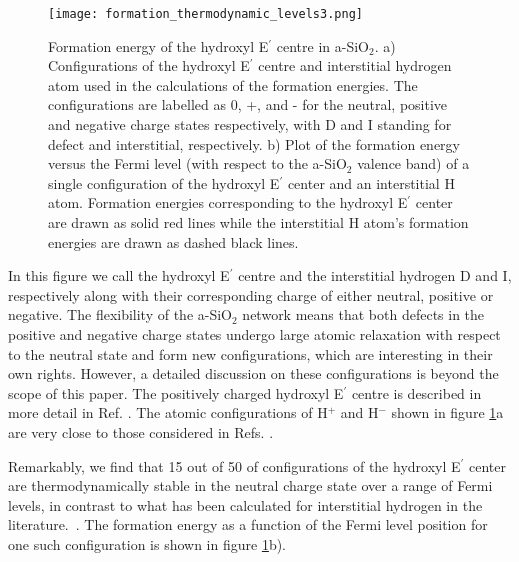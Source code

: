 \documentclass[aps,prb,reprint,superscriptaddress,showpacs]{revtex4-1}
\begin{document}
\begin{figure}[h!]
\texttt{[image: formation\_thermodynamic\_levels3.png]}
\caption{Formation energy of the hydroxyl E$^\prime$ centre in a-SiO$_2$. a) Configurations of the hydroxyl E$^\prime$ centre and interstitial hydrogen atom used in the calculations of the formation energies.  The configurations are labelled as 0, +, and - for the neutral, positive and negative charge states respectively, with D and I standing for defect and interstitial, respectively. b) Plot of the formation energy versus the Fermi level (with respect to the a-SiO$_2$ valence band) of a single configuration of the hydroxyl E$^\prime$ center and an interstitial H atom. Formation energies corresponding to the hydroxyl E$^\prime$ center are drawn as solid red lines while the interstitial H atom's formation energies are drawn as dashed black lines. }
\label{fig:hydroxy_thermodynamic}
\end{figure}

In this figure we call the hydroxyl E$^\prime$ centre and the interstitial hydrogen D and I, respectively along with their corresponding charge of either neutral, positive or negative. The flexibility of the a-SiO$_2$ network means that both defects in the positive and negative charge states undergo large atomic relaxation with respect to the neutral state and form new configurations, which are interesting in their own rights. However, a detailed discussion on these configurations is beyond the scope of this paper. The positively charged hydroxyl E$^\prime$ centre is described in more detail in Ref. \cite{h_charged_mee}. The atomic configurations of H$^+$ and H$^-$ shown in figure \ref{fig:hydroxy_thermodynamic}a are very close to  those considered in Refs. \cite{godet_hydrogen,robertson_oxides}.

Remarkably, we find that 15 out of 50 of configurations of the hydroxyl E$^\prime$ center are thermodynamically stable in the neutral charge state over a range of Fermi levels, in contrast to what has been calculated for interstitial hydrogen in the literature.~\cite{godet_hydrogen,robertson_oxides}.  The formation energy as a function of the Fermi level position for one such configuration is shown in figure \ref{fig:hydroxy_thermodynamic}b). 
\end{document}
